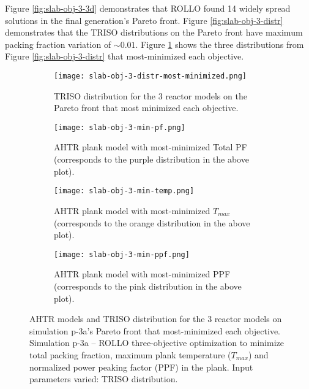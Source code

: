 Figure \ref{fig:slab-obj-3-3d} demonstrates that \gls{ROLLO} found 14 widely spread 
solutions in the final generation's Pareto front. 
Figure \ref{fig:slab-obj-3-distr} demonstrates that the TRISO distributions on the
Pareto front have maximum packing fraction variation of $\sim0.01$. 
Figure \ref{fig:slab-obj-3-distr-most-minimized} shows the three distributions from 
Figure \ref{fig:slab-obj-3-distr} that most-minimized each objective. 
\begin{figure}[htbp!]
    \centering
    \begin{subfigure}{\textwidth}
        \texttt{[image: slab-obj-3-distr-most-minimized.png]}
        \caption{TRISO distribution for the 3 reactor models on the Pareto front
        that most minimized each objective.}
        \label{fig:slab-obj-3-distr-most-minimized}
    \end{subfigure}
    \begin{subfigure}{0.8\textwidth}
        \texttt{[image: slab-obj-3-min-pf.png]}
        \caption{\gls{AHTR} plank model with most-minimized Total PF 
        (corresponds to the purple distribution in the above plot).}
        \label{fig:slab-obj-3-min-pf} 
    \end{subfigure}
    \begin{subfigure}{0.8\textwidth}
        \texttt{[image: slab-obj-3-min-temp.png]}
        \caption{\gls{AHTR} plank model with most-minimized $T_{max}$
        (corresponds to the orange distribution in the above plot).}
        \label{fig:slab-obj-3-min-temp} 
    \end{subfigure}
    \begin{subfigure}{0.8\textwidth}
        \texttt{[image: slab-obj-3-min-ppf.png]}
        \caption{\gls{AHTR} plank model with most-minimized PPF
        (corresponds to the pink distribution in the above plot).}
        \label{fig:slab-obj-3-min-ppf} 
    \end{subfigure}
    \caption{AHTR models and TRISO distribution for the 3 reactor models on simulation 
    p-3a's Pareto front that most-minimized each objective.
    Simulation p-3a -- ROLLO three-objective optimization to minimize total packing fraction, 
    maximum plank temperature ($T_{max}$) and normalized power peaking factor (PPF) in the plank. 
    Input parameters varied: TRISO distribution.}
    \label{fig:slab-obj-3-most-minimized}
\end{figure}


